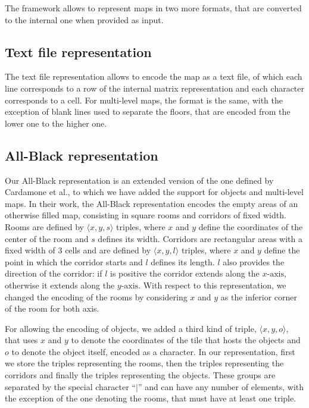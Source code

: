 \par

The framework allows to represent maps in two more formats, that are converted to the internal one when provided as input.


\subsection{Text file representation}

The text file representation allows to encode the map as a text file, of which each line corresponds to a row of the internal matrix representation and each character corresponds to a cell. For multi-level maps, the format is the same, with the exception of blank lines used to separate the floors, that are encoded from the lower one to the higher one.


\subsection{All-Black representation}

Our All-Black representation is an extended version of the one defined by Cardamone et al.\cite{Cardamone:2011:EIM:2008402.2008411}, to which we have added the support for objects and multi-level maps. In their work, the All-Black representation encodes the empty areas of an otherwise filled map, consisting in square rooms and corridors of fixed width. Rooms are defined by $\langle x,y,s \rangle$ triples, where $x$ and $y$ define the coordinates of the center of the room and $s$ defines its width. Corridors are rectangular areas with a fixed width of $3$ cells and are defined by $\langle x,y,l \rangle$ triples, where $x$ and $y$ define the point in which the corridor starts and $l$ defines its length. $l$ also provides the direction of the corridor: if $l$ is positive the corridor extends along the $x\text{-axis}$, otherwise it extends along the $y\text{-axis}$. With respect to this representation, we changed the encoding of the rooms by considering $x$ and $y$ as the inferior corner of the room for both axis.

\par

For allowing the encoding of objects, we added a third kind of triple, $\langle x,y,o \rangle$, that uses $x$ and $y$ to denote the coordinates of the tile that hosts the objects and $o$ to denote the object itself, encoded as a character. In our representation, first we store the triples representing the rooms, then the triples representing the corridors and finally the triples representing the objects. These groups are separated by the special character ``$\mid$'' and can have any number of elements, with the exception of the one denoting the rooms, that must have at least one triple.

